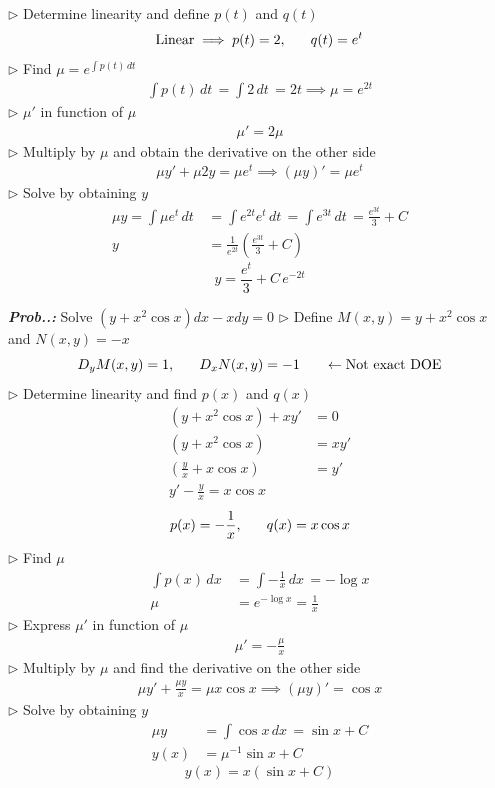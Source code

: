 \documentclass[a4paper]{article}
\begin{document}
$\triangleright$ Determine linearity and define $p(t)$ and $q(t)$
$$
\text{Linear}\implies p(t)=2,\hspace{4ex}q(t)=e^{ t }
$$
$\triangleright$ Find $\mu=e^{ \int p(t) \, dt\, }$
\begin{align}
\int p(t) \, dt\, =\int 2 \, dt\, =2t\implies \mu=e^{ 2t }
\end{align}
$\triangleright$ $\mu'$ in function of $\mu$
\begin{align}
\mu'=2\mu
\end{align}
$\triangleright$ Multiply by $\mu$ and obtain the derivative on the other side
\begin{align}
\mu y'+\mu 2y=\mu e^{ t }\implies(\mu y)'=\mu e^{ t }
\end{align}
$\triangleright$ Solve by obtaining $y$
\begin{align}
\mu y=\int \mu e^{ t } \, dt\, &=\int e^{ 2t }e^{ t } \, dt\, =\int e^{ 3t } \, dt\, =\frac{e^{ 3t }}{3}+C \\
y&=\frac{1}{e^{ 2t }}\left( \frac{e^{ 3t }}{3}+C \right)
\end{align}
$$
\boxed{y=\frac{e^{ t }}{3}+C\,e^{ -2t }}
$$

\vspace{2ex}\textbf{\textit{Prob.\thesection.\theprob: }}Solve $(y+x^{2}\cos x)dx-xdy=0$ 
$\triangleright$ Define $M(x,y)=y+x^{2}\cos x$ and $N(x,y)=-x$
$$
D_{y}M(x,y)=1,\hspace{4ex}D_{x}N(x,y)=-1 \hspace{4ex}\leftarrow\text{Not exact DOE}
$$
$\triangleright$ Determine linearity and find $p(x)$ and $q(x)$
\begin{align}
(y+x^{2}\cos x)+xy'&=0 \\
(y+x^{2}\cos x)&=xy' \\
\left( \frac{y}{x}+x\cos x \right)&=y' \\
y'-\frac{y}{x}=x\cos x
\end{align}
$$
p(x)=-\frac{1}{x},\hspace{4ex}q(x)=x\cos x
$$
$\triangleright$ Find $\mu$
\begin{align}
\int p(x) \, dx\, &=\int -\frac{1}{x} \, dx\, =-\log x \\
\mu&=e^{ -\log x }=\frac{1}{x}
\end{align}
$\triangleright$ Express $\mu'$ in function of $\mu$
\begin{align}
\mu'=-\frac{\mu}{x}
\end{align}
$\triangleright$ Multiply by $\mu$ and find the derivative on the other side
\begin{align}
\mu y'+\frac{\mu y}{x}=\mu x\cos x \implies (\mu y)'=\cos x
\end{align}
$\triangleright$ Solve by obtaining $y$
\begin{align}
\mu y&=\int \cos x \, dx\, =\sin x+C  \\
y(x)&=\mu^{-1}\sin x+C
\end{align}
$$
\boxed{y(x)=x(\sin x+C)}
$$
\end{document}
